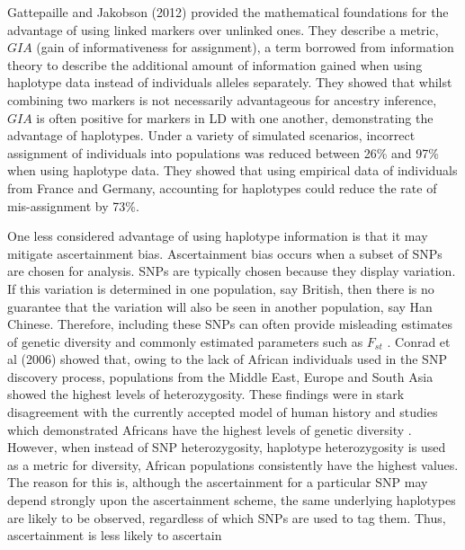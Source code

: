 Gattepaille and Jakobson (2012) \cite{JakobssonCombiningMarkers} provided the mathematical foundations for the advantage of using linked markers over unlinked ones. They describe a metric, $GIA$ (gain of informativeness for assignment), a term borrowed from information theory to describe the additional amount of information gained when using haplotype data instead of individuals alleles separately. They showed that whilst combining two markers is not necessarily advantageous for ancestry inference, $GIA$ is often positive for markers in LD with one another, demonstrating the advantage of haplotypes. Under a variety of simulated scenarios, incorrect assignment of individuals into populations was reduced between 26\% and 97\% when using haplotype data. They showed that using empirical data of individuals from France and Germany, accounting for haplotypes could reduce the rate of mis-assignment by 73\%. 

One less considered advantage of using haplotype information is that it may mitigate ascertainment bias. Ascertainment bias occurs when a subset of SNPs are chosen for analysis. SNPs are typically chosen because they display variation. If this variation is determined in one population, say British, then there is no guarantee that the variation will also be seen in another population, say Han Chinese. Therefore, including these SNPs can often provide misleading estimates of genetic diversity and commonly estimated parameters such as $F_{st}$ \cite{BergstromHGDP}. Conrad et al (2006) showed that, owing to the lack of African individuals used in the SNP discovery process, populations from the Middle East, Europe and South Asia showed the highest levels of heterozygosity. These findings were in stark disagreement with the currently accepted model of human history and studies which demonstrated Africans have the highest levels of genetic diversity \cite{rosenberg2002genetic, ramachandran2005support, bowcock1994high}. However, when instead of SNP heterozygosity, haplotype heterozygosity is used as a metric for diversity, African populations consistently have the highest values. The reason for this is, although the ascertainment for a particular SNP may depend strongly upon the ascertainment scheme, the same underlying haplotypes are likely to be observed, regardless of which SNPs are used to tag them. Thus, ascertainment is less likely to ascertain

